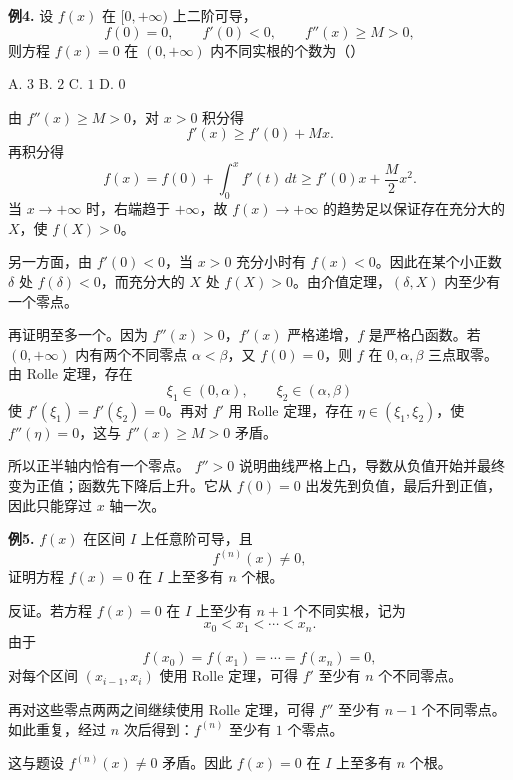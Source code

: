 \begin{problemblock}
\textbf{例4.} 设 \(f(x)\) 在 \([0,+\infty)\) 上二阶可导，
\[
f(0)=0,\qquad f'(0)<0,\qquad f''(x)\ge M>0,
\]
则方程 \(f(x)=0\) 在 \((0,+\infty)\) 内不同实根的个数为（\quad）

A. \(3\) \qquad B. \(2\) \qquad C. \(1\) \qquad D. \(0\)
\end{problemblock}
\begin{solutionblock}
由 \(f''(x)\ge M>0\)，对 \(x>0\) 积分得
\[
f'(x)\ge f'(0)+Mx.
\]
再积分得
\[
f(x)=f(0)+\int_0^x f'(t)\,dt
\ge f'(0)x+\frac{M}{2}x^2.
\]
当 \(x\to+\infty\) 时，右端趋于 \(+\infty\)，故 \(f(x)\to+\infty\) 的趋势足以保证存在充分大的 \(X\)，使 \(f(X)>0\)。

另一方面，由 \(f'(0)<0\)，当 \(x>0\) 充分小时有 \(f(x)<0\)。因此在某个小正数 \(\delta\) 处 \(f(\delta)<0\)，而充分大的 \(X\) 处 \(f(X)>0\)。由介值定理，\((\delta,X)\) 内至少有一个零点。

再证明至多一个。因为 \(f''(x)>0\)，\(f'(x)\) 严格递增，\(f\) 是严格凸函数。若 \((0,+\infty)\) 内有两个不同零点 \(\alpha<\beta\)，又 \(f(0)=0\)，则 \(f\) 在 \(0,\alpha,\beta\) 三点取零。由 Rolle 定理，存在
\[
\xi_1\in(0,\alpha),\qquad \xi_2\in(\alpha,\beta)
\]
使 \(f'(\xi_1)=f'(\xi_2)=0\)。再对 \(f'\) 用 Rolle 定理，存在 \(\eta\in(\xi_1,\xi_2)\)，使 \(f''(\eta)=0\)，这与 \(f''(x)\ge M>0\) 矛盾。

所以正半轴内恰有一个零点。
\(f''>0\) 说明曲线严格上凸，导数从负值开始并最终变为正值；函数先下降后上升。它从 \(f(0)=0\) 出发先到负值，最后升到正值，因此只能穿过 \(x\) 轴一次。
\end{solutionblock}

\begin{problemblock}
\textbf{例5.} \(f(x)\) 在区间 \(I\) 上任意阶可导，且
\[
f^{(n)}(x)\ne0,
\]
证明方程 \(f(x)=0\) 在 \(I\) 上至多有 \(n\) 个根。
\end{problemblock}
\begin{solutionblock}
反证。若方程 \(f(x)=0\) 在 \(I\) 上至少有 \(n+1\) 个不同实根，记为
\[
x_0<x_1<\cdots<x_n.
\]
由于
\[
f(x_0)=f(x_1)=\cdots=f(x_n)=0,
\]
对每个区间 \((x_{i-1},x_i)\) 使用 Rolle 定理，可得 \(f'\) 至少有 \(n\) 个不同零点。

再对这些零点两两之间继续使用 Rolle 定理，可得 \(f''\) 至少有 \(n-1\) 个不同零点。如此重复，经过 \(n\) 次后得到：\(f^{(n)}\) 至少有 \(1\) 个零点。

这与题设 \(f^{(n)}(x)\ne0\) 矛盾。因此 \(f(x)=0\) 在 \(I\) 上至多有 \(n\) 个根。
\end{solutionblock}

